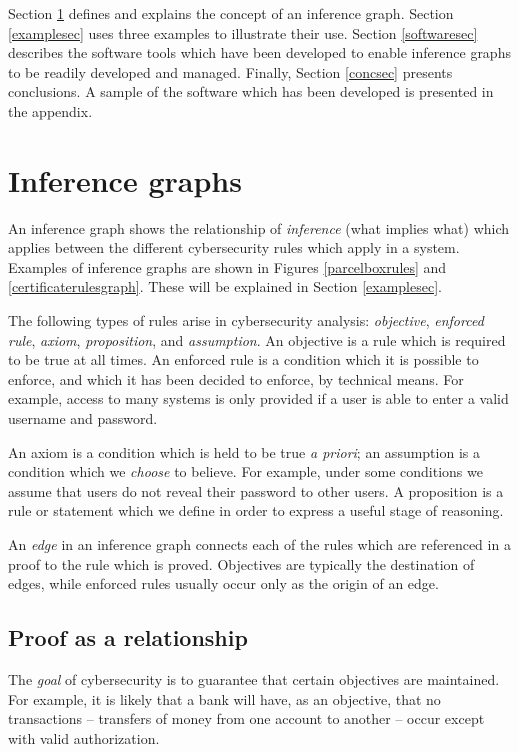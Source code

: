 Section \ref{inferencesec} defines and explains the concept of an inference graph.
Section \ref{examplesec} uses three examples to illustrate their use. Section \ref{softwaresec}
describes the software tools which have been developed to enable inference
graphs to be readily developed and managed. Finally, Section \ref{concsec}
presents conclusions. A sample of the software which has been developed is presented in the appendix.

 
\section{Inference graphs}\label{inferencesec}
An inference graph shows the relationship of {\em inference} (what implies what)
which applies between the different cybersecurity rules which apply in a system.
Examples of inference graphs are shown in Figures \ref{parcelboxrules} 
and \ref{certificaterulesgraph}. These will be explained in Section \ref{examplesec}.

The following types of rules arise in cybersecurity analysis:
{\em objective}, {\em enforced rule}, {\em axiom}, {\em proposition}, and {\em assumption}.
An objective is a rule which is required to be true at all times.
An enforced rule is a condition which it is possible to enforce,
and which it has been decided to enforce, by technical means.
For example, access to many systems is only provided if a user is able
to enter a valid username and password.

An axiom is a condition which is held to be true {\em a priori};
an assumption is a condition which we {\em choose} to believe.
For example, under some conditions we assume that users do not reveal their
password to other users.
A proposition is a rule or statement which we define in order
to express a useful stage of reasoning.

An {\em edge} in an inference graph connects each of the rules which
 are referenced in a proof to the rule which is proved. Objectives
are typically the destination of edges, while enforced rules 
usually occur only as the origin of an edge.


\subsection{Proof as a relationship}
The {\em goal} of cybersecurity is to guarantee that certain objectives
are maintained. For example, it is likely that a bank will have, as an
objective, that no transactions -- transfers of money from
one account to another -- occur except with valid authorization.

